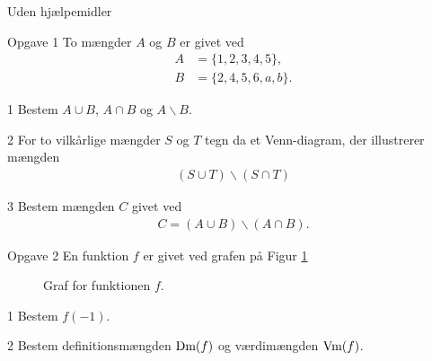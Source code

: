 \documentclass[12pt,x11names,a4paper]{article}
\begin{document}
\newpage

\begin{center}
	\LARGE
	Uden hjælpemidler
\end{center}
\begin{opgavetekst}{Opgave 1}
	To mængder $A$ og $B$ er givet ved
	\begin{align*}
		A &= \{1,2,3,4,5\}, \\
		B &= \{2,4,5,6,a,b\}.
	\end{align*}
\end{opgavetekst}
\begin{delopgave}{}{1}
	Bestem $A \cup B$, $A \cap B$ og $A \backslash B$. 
\end{delopgave}
\begin{delopgave}{}{2}
	For to vilkårlige mængder $S$ og $T$ tegn da et Venn-diagram, der illustrerer mængden 
	\begin{align*}
		(S\cup T)\backslash (S\cap T)
	\end{align*}
\end{delopgave}
\begin{delopgave}{}{3}
	Bestem mængden $C$ givet ved
	\begin{align*}
		C = (A\cup B)\backslash (A \cap B).
	\end{align*}
\end{delopgave}
\begin{opgavetekst}{Opgave 2}
	En funktion $f$ er givet ved grafen på Figur \ref{fig:defværd}
	\begin{figure}[H]	
	\centering
	\caption{Graf for funktionen $f$.}
	\label{fig:defværd}
	\end{figure}
	\phantom{h}
\end{opgavetekst}
\begin{delopgave}{}{1}
	Bestem $f(-1)$.
\end{delopgave}
\begin{delopgave}{}{2}
	Bestem definitionsmængden $\textnormal{Dm}(f)$ og værdimængden $\textnormal{Vm}(f)$.
\end{delopgave}
\end{document}
